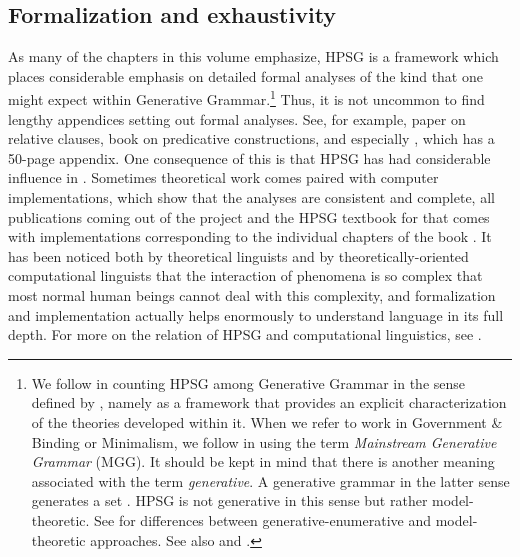 \documentclass[output=paper,biblatex,babelshorthands,newtxmath,draftmode,colorlinks,citecolor=brown]{langscibook}
\begin{document}
\subsection{Formalization and exhaustivity}
\label{sec-form-exhaust}\label{minimalism:sec-formalization-exhaustivity}

As many of the chapters in this volume emphasize, HPSG is a framework which places considerable
emphasis on detailed formal analyses of the kind that one might expect within Generative
Grammar.\footnote{%
We follow \citet[]{GSag2000a-u} in counting HPSG among Generative Grammar in the sense
defined by \citet[]{Chomsky65a}, namely as a framework that provides an explicit
characterization of the theories developed within it.
When we refer to work in Government \& Binding or Minimalism, we follow \citet[]{CJ2005a} in using
the term \emph{Mainstream Generative Grammar} (MGG). It should be kept in mind that there is another
meaning associated with the term \emph{generative}. A generative grammar in the latter sense
generates a set \citep[]{Chomsky57a}. HPSG is not generative in this sense but rather model-theoretic. See \citet{PS2001a}
for differences between generative-enumerative and model-theoretic approaches. See also
 and .
}
Thus, it is not uncommon to find lengthy appendices setting out formal analyses. See, for
example,  paper on  relative clauses,
 book on predicative \pagebreak{}constructions, and especially \citet{GSag2000a-u},
which has a 50-page appendix. One consequence of this is that HPSG has had 
considerable influence in . Sometimes theoretical work comes paired
with computer implementations, which show that the analyses are consistent and complete, \eg all
publications coming out of the  project \citep{MuellerCoreGram} and the HPSG textbook
for  that comes with implementations corresponding to the individual chapters of the book
\citep{MuellerGrammix}. It has been noticed both by theoretical linguists \citep[]{Bierwisch63a} and
by theoretically-oriented computational linguists \citep[]{Abney96a} that the interaction of phenomena
is so complex that most normal human beings cannot deal with this complexity, and formalization and
implementation actually helps enormously to understand language in its full depth. For more on the
relation of HPSG and computational linguistics, see .
\end{document}
